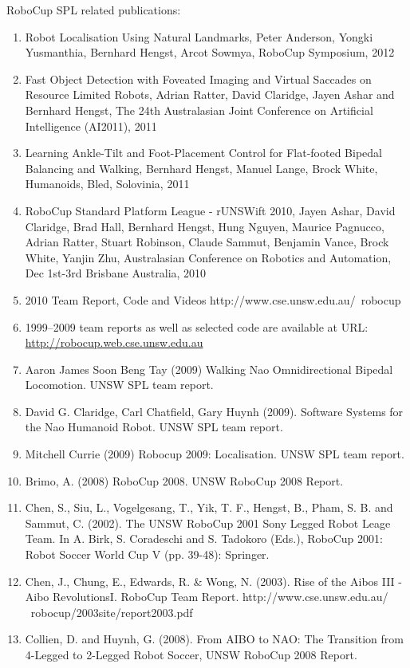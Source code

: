 \documentclass[runningheads,a4paper]{llncs}
\begin{document}
RoboCup SPL related publications:
\begin{enumerate}
\item Robot Localisation Using Natural Landmarks, Peter Anderson, Yongki Yusmanthia, Bernhard Hengst, Arcot Sowmya, RoboCup Symposium, 2012
\item Fast Object Detection with Foveated Imaging and Virtual Saccades on Resource Limited Robots, Adrian Ratter, David Claridge, Jayen Ashar and Bernhard Hengst, The 24th Australasian Joint Conference on Artificial Intelligence (AI2011), 2011
\item Learning Ankle-Tilt and Foot-Placement Control for Flat-footed Bipedal Balancing and Walking, Bernhard Hengst, Manuel Lange, Brock White, Humanoids, Bled, Solovinia, 2011
\item RoboCup Standard Platform League - rUNSWift 2010, Jayen Ashar, David Claridge, Brad Hall, Bernhard Hengst, Hung Nguyen, Maurice Pagnucco, Adrian Ratter, Stuart Robinson, Claude Sammut, Benjamin Vance, Brock White, Yanjin Zhu, Australasian Conference on Robotics and Automation, Dec 1st-3rd Brisbane Australia, 2010
\item 2010 Team Report, Code and Videos http://www.cse.unsw.edu.au/~robocup
\item 1999--2009 team reports as well as selected code are available at URL:\\
\url{http://robocup.web.cse.unsw.edu.au}
\item Aaron James Soon Beng Tay (2009) Walking Nao Omnidirectional Bipedal Locomotion. UNSW SPL team report.
\item David G. Claridge, Carl Chatfield, Gary Huynh (2009). Software Systems for the Nao Humanoid Robot. UNSW SPL team report.
\item Mitchell Currie (2009) Robocup 2009: Localisation. UNSW SPL team report.
\item Brimo, A. (2008) RoboCup 2008. UNSW RoboCup 2008 Report.
\item Chen, S., Siu, L., Vogelgesang, T., Yik, T. F., Hengst, B., Pham, S. B. and Sammut, C. (2002). The UNSW RoboCup 2001 Sony Legged Robot Leage Team. In A. Birk, S. Coradeschi and S. Tadokoro (Eds.), RoboCup 2001: Robot Soccer World Cup V (pp. 39-48): Springer.
\item Chen, J., Chung, E., Edwards, R. \& Wong, N. (2003). Rise of the Aibos III - Aibo RevolutionsI. RoboCup Team Report. http://www.cse.unsw.edu.au/ ~robocup/2003site/report2003.pdf
\item Collien, D. and Huynh, G. (2008). From AIBO to NAO: The Transition from 4-Legged to 2-Legged Robot Soccer, UNSW RoboCup 2008 Report.

\end{enumerate}
\end{document}
